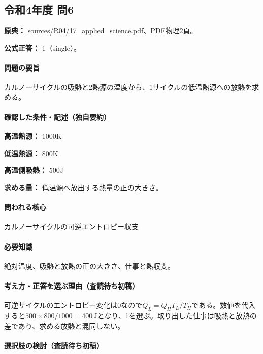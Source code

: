 \subsection{令和4年度 問6}
\label{q:r04-reg-applied-06}

\noindent\textbf{原典：} sources/R04/17\_applied\_science.pdf、PDF物理2頁。

\textbf{公式正答：} 1（single）。

\paragraph{問題の要旨} カルノーサイクルの吸熱と2熱源の温度から、1サイクルの低温熱源への放熱を求める。

\paragraph{確認した条件・記述（独自要約）}\mbox{}\par

\noindent\textbf{高温熱源：} 1000K\par

\noindent\textbf{低温熱源：} 800K\par

\noindent\textbf{高温側吸熱：} 500J\par

\noindent\textbf{求める量：} 低温源へ放出する熱量の正の大きさ。\par

\paragraph{問われる核心} カルノーサイクルの可逆エントロピー収支

\paragraph{必要知識} 絶対温度、吸熱と放熱の正の大きさ、仕事と熱収支。

\paragraph{考え方・正答を選ぶ理由（査読待ち初稿）} 可逆サイクルのエントロピー変化は0なので\(Q_L=Q_HT_L/T_H\)である。数値を代入すると\(500\times800/1000=400\,\mathrm{J}\)となり、1を選ぶ。取り出した仕事は吸熱と放熱の差であり、求める放熱と混同しない。

\paragraph{選択肢の検討（査読待ち初稿）}\mbox{}\par

